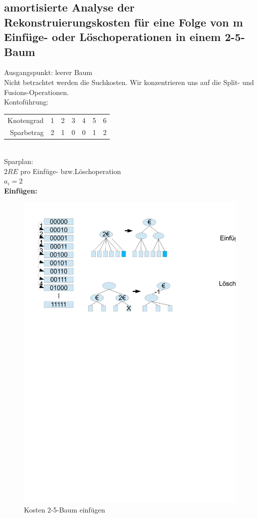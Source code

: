 \documentclass[a4paper,twoside,10pt]{report}
\begin{document}
\subsection{amortisierte Analyse der Rekonstruierungskosten für eine Folge von m Einfüge- oder Löschoperationen in einem 2-5-Baum}
Ausgangspunkt: leerer Baum\\
Nicht betrachtet werden die Suchkosten. Wir konzentrieren uns auf die Split- und Fusions-Operationen.\\[.5em]
Kontoführung:\\
\begin{tabular}{rcccccc}
Knotengrad&1&2&3&4&5&6\\
Sparbetrag&2&1&0&0&1&2
\end{tabular}\\[.5em]
Sparplan:\\
$2RE$ pro Einfüge- bzw.Löschoperation\\
$a_i=2$\\
\textbf{Einfügen:}
\begin{figure}[H]\center
\includegraphics[trim= 6cm 24cm 6cm 1cm,clip,width=\columnwidth]{figures/zaehler.pdf}
\caption{Kosten 2-5-Baum einfügen}
\end{figure}
\end{document}
